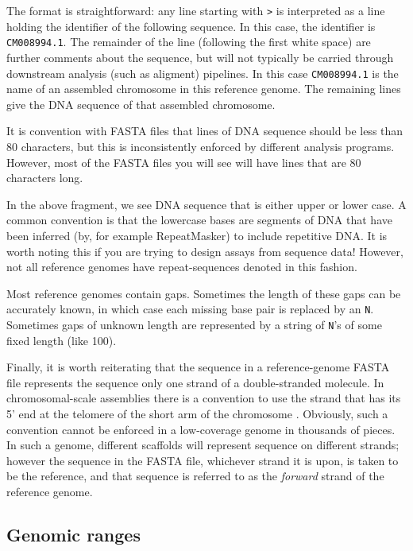 \documentclass[]{krantz}
\begin{document}
The format is straightforward: any line starting with \texttt{\textgreater{}} is interpreted as a
line holding the identifier of the following sequence. In this case, the identifier
is \texttt{CM008994.1}. The remainder of the line (following the first white space) are
further comments about the sequence, but will not typically be carried through
downstream analysis (such as aligment) pipelines. In this case \texttt{CM008994.1} is
the name of an assembled chromosome in this reference genome. The remaining lines give
the DNA sequence of that assembled chromosome.

It is convention with FASTA files that lines of DNA sequence should be less
than 80 characters, but this is inconsistently enforced by different analysis
programs. However, most of the FASTA files you will see will have lines that
are 80 characters long.

In the above fragment, we see DNA sequence that is either upper or lower case.
A common convention is that the lowercase bases are segments of DNA that
have been inferred (by, for example RepeatMasker) to include repetitive DNA.
It is worth noting this if you are trying to design assays from sequence
data! However, not all reference genomes have repeat-sequences denoted
in this fashion.

Most reference genomes contain gaps. Sometimes the length of these gaps
can be accurately known, in which case each missing base pair is replaced by
an \texttt{N}. Sometimes gaps of unknown length are represented by a string of \texttt{N}'s of
some fixed length (like 100).

Finally, it is worth reiterating that the sequence in a reference-genome FASTA file represents
the sequence only one strand of a double-stranded molecule. In chromosomal-scale assemblies
there is a convention to use the strand that has its 5' end at the telomere of the
short arm of the chromosome \citep{cartwrightMultiplePersonalitiesWatson2011}.
Obviously, such a convention cannot be enforced
in a low-coverage genome in thousands of pieces. In such a genome, different
scaffolds will represent sequence on different strands; however the sequence
in the FASTA file, whichever strand it is upon, is taken to be the reference,
and that sequence is referred to as the \emph{forward} strand of the reference genome.

\hypertarget{genomic-ranges}{%
\subsection{Genomic ranges}\label{genomic-ranges}}
\end{document}

